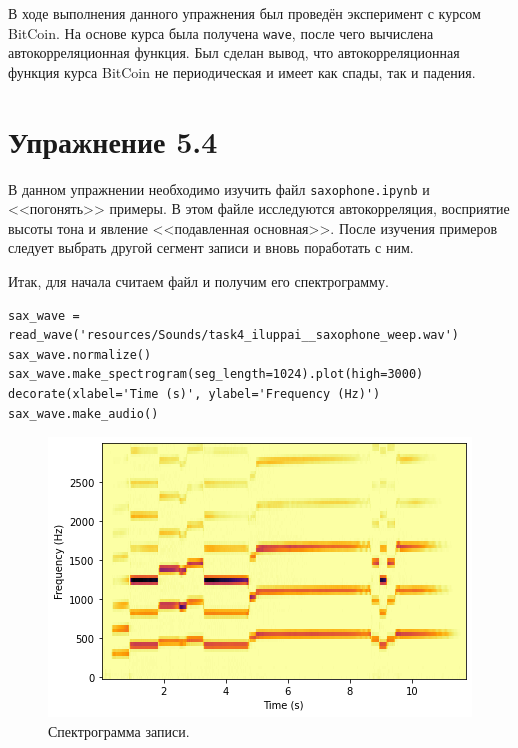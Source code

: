 \documentclass[a4paper, 14pt]{extarticle}
\begin{document}
    В ходе выполнения данного упражнения был проведён эксперимент с курсом BitCoin. На основе курса была получена
    \texttt{wave}, после чего вычислена автокорреляционная функция. Был сделан вывод, что автокорреляционная функция
    курса BitCoin не периодическая и имеет как спады, так и падения.

    \newpage

    \section{Упражнение 5.4}
    \label{sec:task4}

    В данном упражнении необходимо изучить файл \texttt{saxophone.ipynb} и <<погонять>> примеры. В этом файле исследуются
    автокорреляция, восприятие высоты тона и явление <<подавленная основная>>.
    После изучения примеров следует выбрать другой сегмент записи и вновь поработать с ним.

    Итак, для начала считаем файл и получим его спектрограмму.

    \begin{lstlisting}[caption= Чтение файла и получение спектрограммы., label={lst:task4_spectrogram}]
sax_wave = read_wave('resources/Sounds/task4_iluppai__saxophone_weep.wav')
sax_wave.normalize()
sax_wave.make_spectrogram(seg_length=1024).plot(high=3000)
decorate(xlabel='Time (s)', ylabel='Frequency (Hz)')
sax_wave.make_audio()   \end{lstlisting}

    \begin{figure}[h]
        \centering
        \includegraphics[width=0.8\linewidth]{resources/Images/task4_spectrogram}
        \caption{Спектрограмма записи.}
        \label{fig:task4_spectrogram}
    \end{figure}
\end{document}
